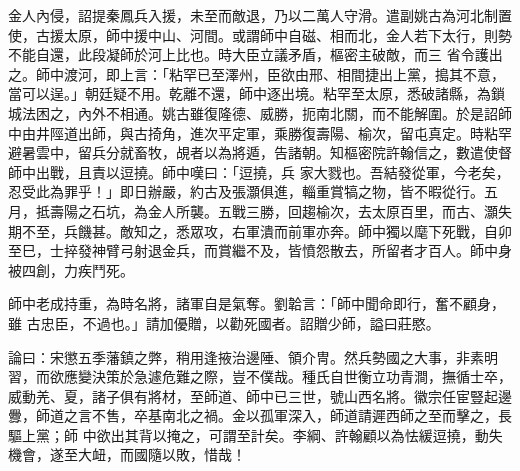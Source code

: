 \begin{pinyinscope}
 金人內侵，詔提秦鳳兵入援，未至而敵退，乃以二萬人守滑。遣副姚古為河北制置使，古援太原，師中援中山、河間。或謂師中自磁、相而北，金人若下太行，則勢不能自還，此段凝師於河上比也。時大臣立議矛盾，樞密主破敵，而三
 省令護出之。師中渡河，即上言：「粘罕已至澤州，臣欲由邢、相間捷出上黨，搗其不意，當可以逞。」朝廷疑不用。乾離不還，師中逐出境。粘罕至太原，悉破諸縣，為鎖城法困之，內外不相通。姚古雖復隆德、威勝，扼南北關，而不能解圍。於是詔師中由井陘道出師，與古掎角，進次平定軍，乘勝復壽陽、榆次，留屯真定。時粘罕避暑雲中，留兵分就畜牧，覘者以為將遁，告諸朝。知樞密院許翰信之，數遣使督師中出戰，且責以逗撓。師中嘆曰：「逗撓，兵
 家大戮也。吾結發從軍，今老矣，忍受此為罪乎！」即日辦嚴，約古及張灝俱進，輜重賞犒之物，皆不暇從行。五月，抵壽陽之石坑，為金人所襲。五戰三勝，回趨榆次，去太原百里，而古、灝失期不至，兵饑甚。敵知之，悉眾攻，右軍潰而前軍亦奔。師中獨以麾下死戰，自卯至巳，士捽發神臂弓射退金兵，而賞繼不及，皆憤怨散去，所留者才百人。師中身被四創，力疾鬥死。



 師中老成持重，為時名將，諸軍自是氣奪。劉韐言：「師中聞命即行，奮不顧身，雖
 古忠臣，不過也。」請加優贈，以勸死國者。詔贈少師，謚曰莊愍。



 論曰：宋懲五季藩鎮之弊，稍用逢掖治邊陲、領介冑。然兵勢國之大事，非素明習，而欲應變決策於急遽危難之際，豈不僕哉。種氏自世衡立功青澗，撫循士卒，威動羌、夏，諸子俱有將材，至師道、師中已三世，號山西名將。徽宗任宦豎起邊釁，師道之言不售，卒基南北之禍。金以孤軍深入，師道請遲西師之至而擊之，長驅上黨；師
 中欲出其背以掩之，可謂至計矣。李綱、許翰顧以為怯緩逗撓，動失機會，遂至大衄，而國隨以敗，惜哉！



\end{pinyinscope}